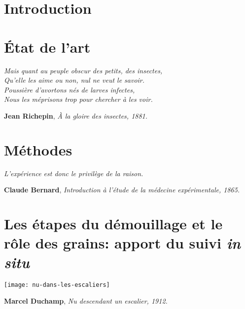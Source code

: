 \documentclass[12pt,french,twoside,openright]{report}
\begin{document}


\newpage
\dominitoc
\tableofcontents
\chapter*{Introduction}
\pagestyle{Introduction}


\pagestyle{body}
\chapter{État de l'art}

\begin{flushleft}
\textit{Mais quant au peuple obscur des petits, des insectes,\\
Qu’elle les aime ou non, nul ne veut le savoir.\\
Poussière d’avortons nés de larves infectes,\\
Nous les méprisons trop pour chercher à les voir.\\}
\end{flushleft}
\begin{flushright}
\textbf{Jean Richepin}, \textit{À la gloire des insectes, 1881.}
\end{flushright}
\newpage


\chapter{Méthodes}
\begin{flushleft}
\textit{L'expérience est donc le privilège de la raison.}
\end{flushleft}
\begin{flushright}
\textbf{Claude Bernard}, \textit{Introduction à l'étude de la médecine expérimentale, 1865.}
\end{flushright}


\chapter{Les étapes du démouillage et le rôle des grains: apport du suivi \textit{in situ}}
\begin{center}
\texttt{[image: nu-dans-les-escaliers]}
\end{center}
\begin{flushright}
\textbf{Marcel Duchamp}, \textit{Nu descendant un escalier, 1912.}
\end{flushright}
\newpage

\end{document}

